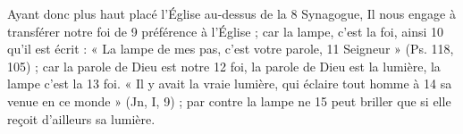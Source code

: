 Ayant donc plus haut placé l'Église au-dessus de la	 
8	 	Synagogue, Il nous engage à transférer notre foi de	 
9	 	préférence à l'Église ; car la lampe, c'est la foi, ainsi	 
10	 	qu'il est écrit : « La lampe de mes pas, c'est votre parole,	 
11	 	Seigneur » (Ps. 118, 105) ; car la parole de Dieu est notre	 
12	 	foi, la parole de Dieu est la lumière, la lampe c'est la	 
13	 	foi. « Il y avait la vraie lumière, qui éclaire tout homme à	 
14	 	sa venue en ce monde » (Jn, I, 9) ; par contre la lampe ne	 
15	 	peut briller que si elle reçoit d'ailleurs sa lumière.
